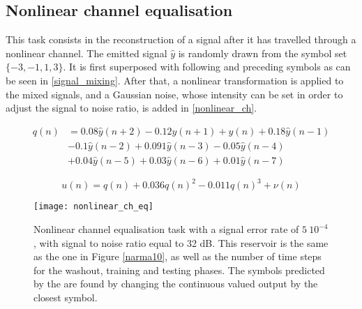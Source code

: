 \subsection{Nonlinear channel equalisation}

This task consists in the reconstruction of a signal after it has travelled through a nonlinear channel. The emitted signal $\hat{y}$ is randomly drawn from the symbol set $\{-3,-1,1,3\}$. It is first superposed with following and preceding symbols as can be seen in \eqref{signal_mixing}. After that, a nonlinear transformation is applied to the mixed signals, and a Gaussian noise, whose intensity can be set in order to adjust the signal to noise ratio, is added in \eqref{nonlinear_ch}. 

\begin{align}
	q(n) &= 0.08\hat{y}(n+2)-0.12\hat{y}(n+1)+\hat{y}(n)+0.18\hat{y}(n-1) \nonumber\\
	&-0.1\hat{y}(n-2)+0.091\hat{y}(n-3)-0.05\hat{y}(n-4) \nonumber\\
	&+0.04\hat{y}(n-5)+0.03\hat{y}(n-6)+0.01\hat{y}(n-7) \label{signal_mixing}
\end{align}

\begin{equation}
	u(n)=q(n)+0.036q(n)^2-0.011q(n)^3+\nu(n)
	\label{nonlinear_ch}
\end{equation}

\begin{figure}[h]
	\centering
	\texttt{[image: nonlinear\_ch\_eq]}
	\caption{Nonlinear channel equalisation task with a signal error rate of $5~10^{-4}$, with signal to noise ratio equal to 32 dB. This reservoir is the same as the one in Figure \ref{narma10}, as well as the number of time steps for the washout, training and testing phases. The symbols predicted by the \rcer are found by changing the continuous valued output by the closest symbol.}
\end{figure}



